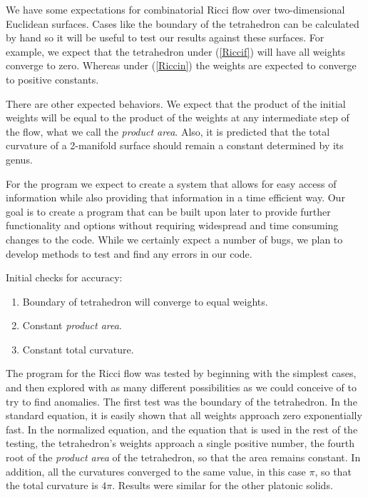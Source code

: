 \documentclass[12pt]{article}
\begin{document}
We have some expectations for combinatorial Ricci flow over two-dimensional Euclidean surfaces. Cases like the boundary of the tetrahedron can be calculated by hand so it will be useful to test our results against these surfaces. For example, we expect that the tetrahedron under (\ref{Riccif}) will have all weights converge to zero. Whereas under (\ref{Riccin}) the weights are expected to converge to positive constants.\newline

\noindent There are other expected behaviors. We expect that the product of the initial weights will be equal to the product of the weights at any intermediate step of the flow, what we call the \textit{product area}. Also, it is predicted that the total curvature of a 2-manifold surface should remain a constant determined by its genus.\newline

\noindent For the program we expect to create a system that allows for easy access of information while also providing that information in a time efficient way. Our goal is to create a program that can be built upon later to provide further functionality and options without requiring widespread and time consuming changes to the code. While we certainly expect a number of bugs, we plan to develop methods to test and find any errors in our code. \newline

\noindent Initial checks for accuracy:
\begin{enumerate}
\item Boundary of tetrahedron will converge to equal weights.
\item Constant \textit{product area}.
\item Constant total curvature.
\end{enumerate}

The program for the Ricci flow was tested by beginning with the simplest cases, and then explored with as many different possibilities as we could conceive of to try to find anomalies. The first test was the boundary of the tetrahedron. In the standard equation, it is easily shown that all weights approach zero exponentially fast. In the normalized equation, and the equation that is used in the rest of the testing, the tetrahedron's weights approach a single positive number, the fourth root of the \textit{product area} of the tetrahedron, so that the area remains constant. In addition, all the curvatures converged to the same value, in this case $\pi$, so that the total curvature is $4\pi$. Results were similar for the other platonic solids.\newline
\end{document}
